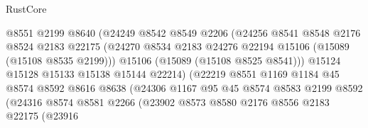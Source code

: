 \begin{lexlean}{RustCore}
\begin{coremodule}
                                  @8551
                                  @2199
                                  @8640
                                  (@24249
                                    @8542
                                    @8549
                                    @2206
                                    (@24256
                                      @8541
                                      @8548
                                      @2176
                                      @8524
                                      @2183
                                      @22175
                                      (@24270
                                        @8534
                                        @2183
                                        @24276
                                        @22194
                                        @15106
                                        (@15089 (@15108 @8535 @2199)))
                                      @15106
                                      (@15089 (@15108 @8525 @8541)))
                                    @15124
                                    @15128
                                    @15133
                                    @15138
                                    @15144
                                    @22214)
                                  (@22219
                                    @8551
                                    @1169
                                    @1184
                                    @45
                                    @8574
                                    @8592
                                    @8616
                                    @8638
                                    (@24306
                                      @1167
                                      @95
                                      @45
                                      @8574
                                      @8583
                                      @2199
                                      @8592
                                      (@24316
                                        @8574
                                        @8581
                                        @2266
                                        (@23902
                                          @8573
                                          @8580
                                          @2176
                                          @8556
                                          @2183
                                          @22175
                                          (@23916

\end{coremodule}
\end{lexlean}
